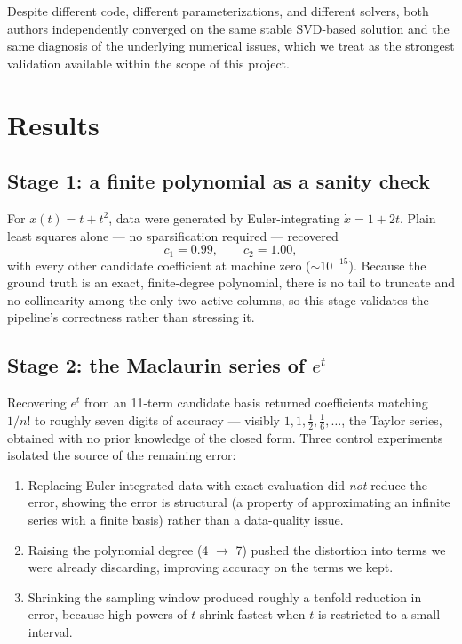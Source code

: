 \documentclass[11pt]{article}
\begin{document}
Despite different code, different parameterizations, and different solvers, both
authors independently converged on the same stable SVD-based solution and the same
diagnosis of the underlying numerical issues, which we treat as the strongest validation
available within the scope of this project.

\section{Results}

\subsection{Stage 1: a finite polynomial as a sanity check}

For $x(t) = t + t^2$, data were generated by Euler-integrating
$\dot{x} = 1 + 2t$. Plain least squares alone --- no sparsification required ---
recovered
\[
c_1 = 0.99, \qquad c_2 = 1.00,
\]
with every other candidate coefficient at machine zero ($\sim 10^{-15}$). Because the
ground truth is an exact, finite-degree polynomial, there is no tail to truncate and no
collinearity among the only two active columns, so this stage validates the pipeline's
correctness rather than stressing it.

\subsection{Stage 2: the Maclaurin series of $e^{t}$}

Recovering $e^{t}$ from an 11-term candidate basis returned coefficients matching $1/n!$
to roughly seven digits of accuracy --- visibly $1, 1, \tfrac{1}{2}, \tfrac{1}{6},
\dots$, the Taylor series, obtained with no prior knowledge of the closed form. Three
control experiments isolated the source of the remaining error:

\begin{enumerate}
  \item Replacing Euler-integrated data with exact evaluation did \emph{not} reduce
  the error, showing the error is structural (a property of approximating an infinite
  series with a finite basis) rather than a data-quality issue.
  \item Raising the polynomial degree (4 $\to$ 7) pushed the distortion into terms we
  were already discarding, improving accuracy on the terms we kept.
  \item Shrinking the sampling window produced roughly a tenfold reduction in error,
  because high powers of $t$ shrink fastest when $t$ is restricted to a small interval.
\end{enumerate}
\end{document}
